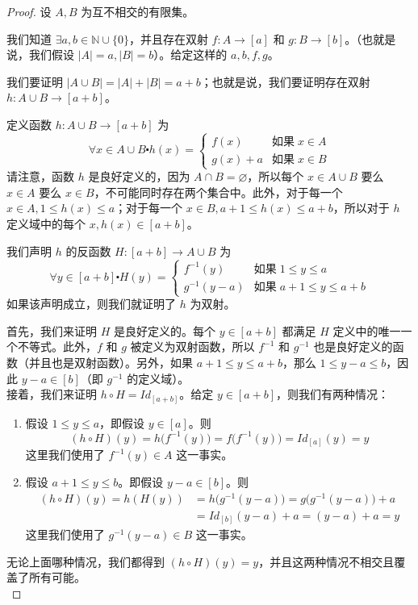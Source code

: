 \begin{proof}
    设 $A,B$ 为互不相交的有限集。

    我们知道 $∃a, b \in \mathbb{N} \cup \{0\}$，并且存在双射 $f : A \to [a]$ 和 $g : B \to [b]$。（也就是说，我们假设 $|A| = a, |B| = b$）。给定这样的 $a, b, f, g$。

    我们要证明 $|A \cup B| = |A| + |B| = a + b$；也就是说，我们要证明存在双射 $h : A \cup B \to [a + b]$。

    定义函数 $h : A \cup B \to [a + b]$ 为
    \[\forall x \in A \cup B \centerdot h(x) = \begin{cases}
        f(x) & \text{如果}\; x \in A \\
        g(x)+a & \text{如果}\; x \in B
    \end{cases}\]
    请注意，函数 $h$ 是良好定义的，因为 $A \cap B = \varnothing$，所以每个 $x \in A \cup B$ 要么 $x \in A$ 要么 $x \in B$，不可能同时存在两个集合中。此外，对于每一个 $x \in A, 1 \le h(x) \le a$；对于每一个 $x \in B, a+1 \le h(x) \le a+b$，所以对于 $h$ 定义域中的每个 $x, h(x) \in [a+b]$。

    我们声明 $h$ 的反函数 $H : [a + b] \to A \cup B$ 为
    \[\forall y \in [a + b] \centerdot H(y) = \begin{cases}
        f^{-1}(y) & \text{如果}\; 1 \le y \le a \\
        g^{-1}(y-a) & \text{如果}\; a+1 \le y \le a+b
    \end{cases}\]
    如果该声明成立，则我们就证明了 $h$ 为双射。

    首先，我们来证明 $H$ 是良好定义的。每个 $y \in [a + b]$ 都满足 $H$ 定义中的唯一一个不等式。此外，$f$ 和 $g$ 被定义为双射函数，所以 $f^{-1}$ 和 $g^{-1}$ 也是良好定义的函数（并且也是双射函数）。另外，如果 $a + 1 \le y \le a + b$，那么 $1 \le y - a \le b$，因此 $y - a \in [b]$（即 $g^{-1}$ 的定义域）。\\

    接着，我们来证明 $h \circ H = Id_{[a+b]}$。给定 $y \in [a+b]$，则我们有两种情况：
    \begin{enumerate}[label=(\arabic*)]
        \item 假设 $1 \le y \le a$，即假设 $y \in [a]$。则
            \[(h \circ H)(y) = h\big(f^{-1}(y)\big) = f\big(f^{-1}(y)\big)= Id_{[a]}(y) = y\]
            这里我们使用了 $f^{-1}(y) \in A$ 这一事实。
        \item 假设 $a + 1 \le y \le b$。即假设 $y-a \in [b]$。则
            \begin{align*}
                (h \circ H)(y) = h(H(y)) &= h\big(g^{-1}(y-a)\big) = g\big(g^{-1}(y-a)\big)+a \\
                &= Id_{[b]}(y - a) + a = (y - a) + a = y
            \end{align*}
            这里我们使用了 $g^{-1}(y - a) \in B$ 这一事实。
    \end{enumerate}
    无论上面哪种情况，我们都得到 $(h \circ H)(y) = y$，并且这两种情况不相交且覆盖了所有可能。\\


\end{proof}

